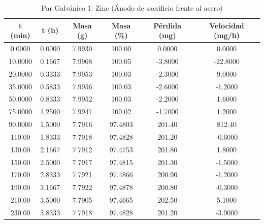 \documentclass[11pt,a4paper]{article}
\begin{document}
\begin{table}[H]
\centering
\caption{Par Galvánico 1: Zinc (Ánodo de sacrificio frente al acero)}
\label{tab:3_6_zn}
\begin{tabular}{cccccc}
\toprule
t (min) & t (h) & Masa (g) & Masa (\%) & Pérdida (mg) & Velocidad (mg/h) \\
\midrule
0.0000 & 0.0000 & 7.9930 & 100.00 & 0.0000 & 0.0000 \\
10.0000 & 0.1667 & 7.9968 & 100.05 & -3.8000 & -22.8000 \\
20.0000 & 0.3333 & 7.9953 & 100.03 & -2.3000 & 9.0000 \\
35.0000 & 0.5833 & 7.9956 & 100.03 & -2.6000 & -1.2000 \\
50.0000 & 0.8333 & 7.9952 & 100.03 & -2.2000 & 1.6000 \\
75.0000 & 1.2500 & 7.9947 & 100.02 & -1.7000 & 1.2000 \\
90.0000 & 1.5000 & 7.7916 & 97.4803 & 201.40 & 812.40 \\
110.00 & 1.8333 & 7.7918 & 97.4828 & 201.20 & -0.6000 \\
130.00 & 2.1667 & 7.7912 & 97.4753 & 201.80 & 1.8000 \\
150.00 & 2.5000 & 7.7917 & 97.4815 & 201.30 & -1.5000 \\
170.00 & 2.8333 & 7.7921 & 97.4866 & 200.90 & -1.2000 \\
190.00 & 3.1667 & 7.7922 & 97.4878 & 200.80 & -0.3000 \\
210.00 & 3.5000 & 7.7905 & 97.4665 & 202.50 & 5.1000 \\
230.00 & 3.8333 & 7.7918 & 97.4828 & 201.20 & -3.9000 \\
\bottomrule
\end{tabular}
\end{table}
\end{document}
